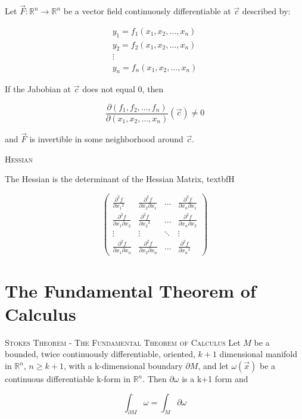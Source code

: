 \documentclass{article}
\begin{document}
Let $\vec{F}: \mathbb{R}^n \to \mathbb{R}^n$ be a vector field continuously differentiable at $\vec{c}$ described by:

\[
\begin{array}{c}
 y_1 = f_1(x_1, x_2, \ldots, x_n) \\
 y_2 = f_2(x_1, x_2, \ldots, x_n) \\
 \vdots \\
 y_n = f_n(x_1, x_2, \ldots, x_n) 
\end{array}
\]

If the Jabobian at $\vec{c}$ does not equal $0$, then

\[
\frac{\partial{(f_1, f_2, \ldots, f_n)}}{\partial{(x_1, x_2, \ldots, x_n)}}(\vec{c}) \neq 0
\]

and $\vec{F}$ is invertible in some neighborhood around $\vec{c}$.

\bigskip

\textsc{Hessian}

The Hessian is the determinant of the Hessian Matrix, textbf{H}

\[
\left( \begin{array}{cccc}
\frac{\partial^2{f}}{\partial{x_1}^2} & \frac{\partial^2{f}}{\partial{x_2}\partial{x_1}} & \ldots & \frac{\partial^2{f}}{\partial{x_n}\partial{x_1}} \\
\frac{\partial^2{f}}{\partial{x_1}\partial{x_2}} & \frac{\partial^2{f}}{\partial{x_2}^2} & \ldots & \frac{\partial^2{f}}{\partial{x_n}\partial{x_2}} \\
\vdots & \vdots & \ddots & \vdots \\ 
\frac{\partial^2{f}}{\partial{x_1}\partial{x_n}} & \frac{\partial^2{f}}{\partial{x_2}\partial{x_n}} & \ldots & \frac{\partial^2{f}}{\partial{x_n}^2}
\end{array} \right)
\]

\bigskip

\section{The Fundamental Theorem of Calculus}

\textsc{Stokes Theorem - The Fundamental Theorem of Calculus}
Let $M$ be a bounded, twice continuously differentiable, oriented, $k + 1$ dimensional manifold in $\mathbb{R}^n$, $n \ge k + 1$, with a k-dimensional boundary $\partial{M}$, and let $\omega(\vec{x})$ be a continuous differentiable k-form in $\mathbb{R}^n$.  Then $\partial{\omega}$ is a k+1 form and 

\[
\int_{\partial{M}} \omega = \int_M \partial{\omega}
\]
\end{document}
